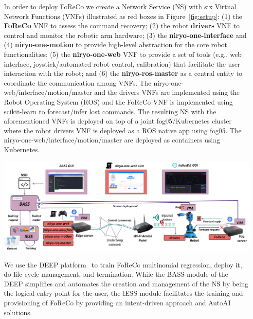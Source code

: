 \documentclass[a0,portrait]{a0poster}
\begin{document}
\begin{multicols}{2}
In order to deploy FoReCo we create
a Network Service (NS) with six
Virtual Network Functions (VNFs)
illustrated as red boxes
in Figure~\ref{fig:setup}:
(1) the \textbf{FoReCo} VNF to assess the command
recovery;
(2) the robot \textbf{drivers} VNF
to control and monitor the robotic arm hardware;
(3) the \textbf{niryo-one-interface} and (4) \textbf{niryo-one-motion} to provide high-level abstraction for the core robot functionalities; (5) the \textbf{niryo-one-web} VNF to provide a set of tools (e.g., web interface, joystick/automated robot control, calibration) that facilitate the user interaction with the robot; and
(6) the \textbf{niryo-ros-master} as a central
entity to coordinate the communication among VNFs.
The niryo-one-web/interface/motion/master and the
drivers VNFs are implemented using
the Robot Operating System
(ROS)%
and the FoReCo VNF is implemented
using 
scikit-learn%
to forecast/infer lost commands.
The resulting NS with the aforementioned VNFs is deployed on top of a joint fog05/Kubernetes cluster where the robot drivers VNF is deployed as a ROS native app using fog05. The niryo-one-web/interface/motion/master are deployed as containers using Kubernetes.


\begin{center}\vspace{1cm}
	\includegraphics[width=\linewidth] {figures/experimental-setup.pdf}
    \label{fig:setup}
\end{center}\vspace{1cm}

We use the DEEP platform~\cite{deep} 
to train FoReCo multinomial regression, deploy it,
do life-cycle management, and termination. While the BASS module of the DEEP simplifies and automates the creation and management of the  NS by being the logical entry point for the user, the IESS module facilitates the training and provisioning of FoReCo by providing an intent-driven approach and AutoAI solutions.



\end{multicols}
\end{document}

